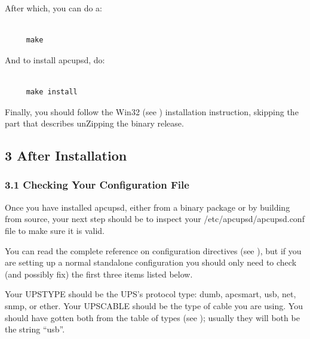 After which, you can do a: 

\footnotesize
\begin{verbatim}
     
     make
\end{verbatim}
\normalsize

And to install apcupsd, do: 

\footnotesize
\begin{verbatim}
     
     make install
\end{verbatim}
\normalsize

Finally, you should follow the Win32 (see 
)
installation instruction, skipping the part that describes unZipping the
binary release. 

\label{After-Installation}

\subsection*{3 After Installation}

\label{index-After-Installation-57}
\label{index-Installation_002c-After-installing-58}

\label{Checking-Your-Configuration-File}

\subsubsection*{3.1 Checking Your Configuration File}

\label{index-Checking-Conf-file-59}
Once you have installed apcupsd, either from a binary package or by building
from source, your next step should be to inspect your
/etc/apcupsd/apcupsd.conf file to make sure it is valid.  

You can read the complete reference on configuration directives (see 
), but if you are
setting up a normal standalone configuration you should only need to check
(and possibly fix) the first three items listed below.  

Your UPSTYPE should be the UPS's protocol type: dumb, apcsmart, usb, net,
snmp, or ether.  Your UPSCABLE should be the type of cable you are using.  You
should have gotten both from the table of types (see 
); usually they will both be the
string ``usb''.  

